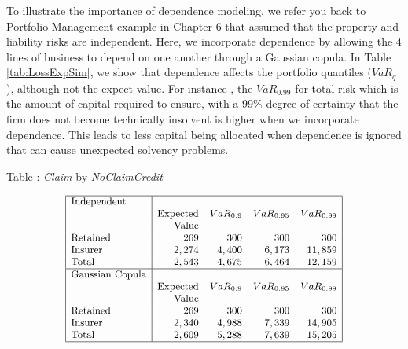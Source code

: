 \documentclass[]{book}
\theoremstyle{definition}
\theoremstyle{definition}
\theoremstyle{definition}
\theoremstyle{remark}
\begin{document}
To illustrate the importance of dependence modeling, we refer you back
to Portfolio Management example in Chapter 6 that assumed that the
property and liability risks are independent. Here, we incorporate
dependence by allowing the 4 lines of business to depend on one another
through a Gaussian copula. In Table \ref{tab:LossExpSim}, we show that
dependence affects the portfolio quantiles (\(VaR_q\)), although not the
expect value. For instance , the \(VaR_{0.99}\) for total risk which is
the amount of capital required to ensure, with a \(99\%\) degree of
certainty that the firm does not become technically insolvent is higher
when we incorporate dependence. This leads to less capital being
allocated when dependence is ignored that can cause unexpected solvency
problems.

Table : \label{tab:LossExpSim} \emph{Claim} by \emph{NoClaimCredit}

\[
{\small \begin{matrix}
\begin{array}{|l|rrrr|} 
    \hline
\text{Independent} &                  &            &             &             \\
                   &\text{Expected}   & VaR_{0.9}  & VaR_{0.95}  & VaR_{0.99}  \\
                   &\text{Value}      &            &             &             \\
\text{Retained}    & 269              &  300       & 300         & 300         \\
\text{Insurer}     & 2,274            &  4,400     & 6,173       & 11,859      \\
\text{Total}       & 2,543            &  4,675     & 6,464       & 12,159      \\
   \hline
\text{Gaussian Copula}&               &            &             &             \\
                      &\text{Expected}& VaR_{0.9}  & VaR_{0.95}  & VaR_{0.99}  \\
                      &\text{Value}    &           &             &              \\
\text{Retained}       & 269            &  300      & 300         &  300         \\
\text{Insurer}        & 2,340          &  4,988    & 7,339       & 14,905       \\
\text{Total}          & 2,609          &  5,288    & 7,639       & 15,205       \\
   \hline
\end{array}
\end{matrix}}
\]
\end{document}

